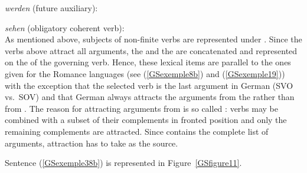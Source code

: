 \ea
\label{GSexemple43}
\emph{werden} (future auxiliary): \\
\z

\ea
\label{GSexemple44}
\emph{sehen} (obligatory coherent verb): \\
\z
As mentioned above, subjects of non-finite verbs are represented under \subj. Since the verbs above
attract all arguments, the \subjv and the \compsv are concatenated and represented on the \argstl of
the governing verb.
Hence, these lexical items are parallel to the ones given for the Romance languages (see
(\ref{GSexemple8b}) and (\ref{GSexemple19})) with the
  exception that the selected verb is the last argument in German (SVO vs.\ SOV) and that German
  always attracts the arguments from the \compsl rather than from \argst. The reason for attracting
  arguments from \comps is so called  \citep{Mueller96a}: verbs may be combined with a
  subset of their complements in fronted position and only the remaining complements are
  attracted. Since \argst contains the complete list of arguments, attraction has to take \comps as
  the source.

Sentence (\ref{GSexemple38b}) is represented in Figure~\ref{GSfigure11}. 



